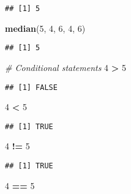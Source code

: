 \documentclass[
]{article}
\newenvironment{Shaded}{\begin{snugshade}}{\end{snugshade}}
\newcommand{\CommentTok}[1]{\textcolor[rgb]{0.56,0.35,0.01}{\textit{#1}}}
\newcommand{\DecValTok}[1]{\textcolor[rgb]{0.00,0.00,0.81}{#1}}
\newcommand{\KeywordTok}[1]{\textcolor[rgb]{0.13,0.29,0.53}{\textbf{#1}}}
\newcommand{\NormalTok}[1]{#1}
\newcommand{\OperatorTok}[1]{\textcolor[rgb]{0.81,0.36,0.00}{\textbf{#1}}}
\newcommand{\StringTok}[1]{\textcolor[rgb]{0.31,0.60,0.02}{#1}}
\begin{document}
\begin{verbatim}
## [1] 5
\end{verbatim}

\begin{Shaded}
\begin{Highlighting}[]
\KeywordTok{median}\NormalTok{(}\DecValTok{5}\NormalTok{, }\DecValTok{4}\NormalTok{, }\DecValTok{6}\NormalTok{, }\DecValTok{4}\NormalTok{, }\DecValTok{6}\NormalTok{)}
\end{Highlighting}
\end{Shaded}

\begin{verbatim}
## [1] 5
\end{verbatim}

\begin{Shaded}
\begin{Highlighting}[]
\CommentTok{# Conditional statements}
\DecValTok{4} \OperatorTok{>}\StringTok{ }\DecValTok{5}
\end{Highlighting}
\end{Shaded}

\begin{verbatim}
## [1] FALSE
\end{verbatim}

\begin{Shaded}
\begin{Highlighting}[]
\DecValTok{4} \OperatorTok{<}\StringTok{ }\DecValTok{5}
\end{Highlighting}
\end{Shaded}

\begin{verbatim}
## [1] TRUE
\end{verbatim}

\begin{Shaded}
\begin{Highlighting}[]
\DecValTok{4} \OperatorTok{!=}\StringTok{ }\DecValTok{5}
\end{Highlighting}
\end{Shaded}

\begin{verbatim}
## [1] TRUE
\end{verbatim}

\begin{Shaded}
\begin{Highlighting}[]
\DecValTok{4} \OperatorTok{==}\StringTok{ }\DecValTok{5}
\end{Highlighting}
\end{Shaded}
\end{document}
